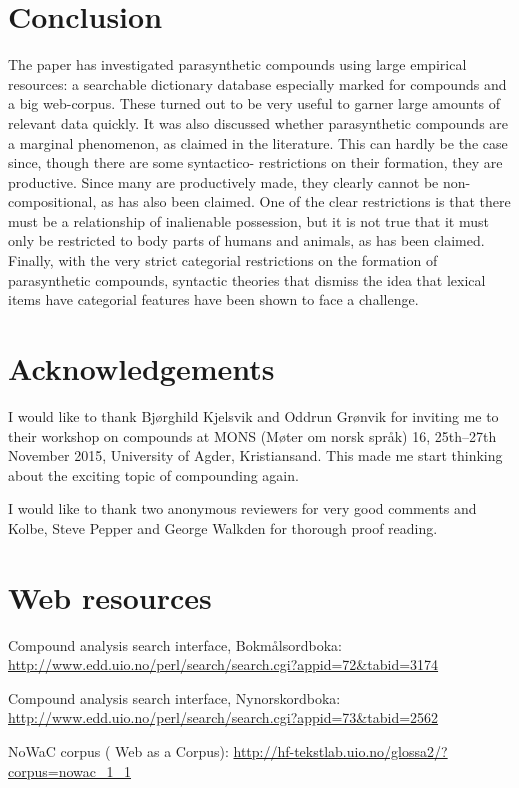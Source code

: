 \documentclass[output=paper]{LSP/langsci}
\begin{document}
\section{Conclusion}\label{sec:bondi:4}

The paper has investigated parasynthetic compounds using large empirical resources: a searchable dictionary database  especially marked for compounds and a big web-corpus. These turned out to be very useful to garner large amounts of relevant data quickly. It was also discussed whether parasynthetic compounds are a marginal phenomenon, as claimed in the literature. This can hardly be the case since, though there are some syntactico- restrictions on their formation, they are productive. Since many are productively made, they clearly cannot be non-compositional, as has also been claimed. One of the clear  restrictions is that there must be a relationship of inalienable possession, but it is not true that it must only be restricted to body parts of humans and animals, as has been claimed. Finally, with the very strict categorial restrictions on the formation of parasynthetic compounds, syntactic theories that dismiss the idea that lexical items have categorial features have been shown to face a challenge.  


 

 


 
\section*{Acknowledgements}
I would like to thank Bjørghild Kjelsvik and Oddrun Grønvik for inviting me to their workshop on compounds at MONS (Møter om norsk språk) 16, 25th–27th November 2015, University of Agder, Kristiansand. This made me start thinking about the exciting topic of compounding again.  

I would like to thank two anonymous reviewers for very good comments and Kolbe, Steve Pepper and George Walkden for thorough proof reading.

\section*{Web resources}

Compound analysis search interface, {Bokmålsordboka}: 
\url{http://www.edd.uio.no/perl/search/search.cgi?appid=72&tabid=3174}

\noindent
Compound analysis search interface, {Nynorskordboka}: 
\url{http://www.edd.uio.no/perl/search/search.cgi?appid=73&tabid=2562}


\noindent
NoWaC corpus  ( Web as a Corpus): 
\url{http://hf-tekstlab.uio.no/glossa2/?corpus=nowac_1_1}

 


\printbibliography[heading=subbibliography,notkeyword=this]
\end{document}
